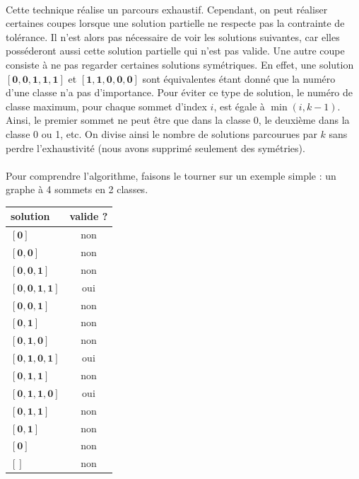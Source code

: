 \documentclass[12pt]{article}
\begin{document}
\paragraph{}Cette technique réalise un parcours exhaustif. Cependant, on peut réaliser certaines coupes lorsque une solution partielle ne respecte pas la contrainte de tolérance. Il n'est alors pas nécessaire de voir les solutions suivantes, car elles posséderont aussi cette solution partielle qui n'est pas valide. Une autre coupe consiste à ne pas regarder certaines solutions symétriques. En effet, une solution $\mathbf{[0,0,1,1,1]}$ et $\mathbf{[1,1,0,0,0]}$ sont équivalentes étant donné que la numéro d'une classe n'a pas d'importance. Pour éviter ce type de solution, le numéro de classe maximum, pour chaque sommet d'index $i$, est égale à $\min\left(i,k-1\right)$. Ainsi, le premier sommet ne peut être que dans la classe 0, le deuxième dans la classe 0 ou 1, etc. On divise ainsi le nombre de solutions parcourues par $k$ sans perdre l'exhaustivité (nous avons supprimé seulement des symétries).

\paragraph{}Pour comprendre l'algorithme, faisons le tourner sur un exemple simple : un graphe à 4 sommets en 2 classes.

\begin{table}[h]
\centering
\begin{tabular}{|l|c|}
	\hline
	solution & valide ? \\
	\hline
	$\mathbf{[0]}$ & non \\
	$\mathbf{[0,0]}$ & non \\
	$\mathbf{[0,0,1]}$ & non \\
	$\mathbf{[0,0,1,1]}$ & oui \\
	$\mathbf{[0,0,1]}$ & non \\
	$\mathbf{[0,1]}$ & non \\
	$\mathbf{[0,1,0]}$ & non \\
	$\mathbf{[0,1,0,1]}$ & oui \\
	$\mathbf{[0,1,1]}$ & non \\
	$\mathbf{[0,1,1,0]}$ & oui \\
	$\mathbf{[0,1,1]}$ & non \\
	$\mathbf{[0,1]}$ & non \\
	$\mathbf{[0]}$ & non \\
	$\mathbf{[]}$ & non \\
	\hline
\end{tabular}
\end{table}
\end{document}
